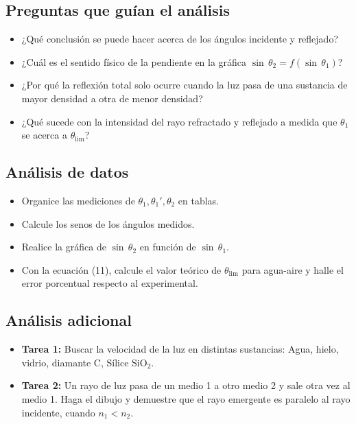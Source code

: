 \subsection{Preguntas que guían el análisis}

\begin{itemize}
    \item ¿Qué conclusión se puede hacer acerca de los ángulos incidente y reflejado?
    \item ¿Cuál es el sentido físico de la pendiente en la gráfica $\sin  \, \theta_2 = f(\sin  \, \theta_1)$?
    \item ¿Por qué la reflexión total solo ocurre cuando la luz pasa de una sustancia de mayor densidad a otra de menor densidad?
    \item ¿Qué sucede con la intensidad del rayo refractado y reflejado a medida que $\theta_1$ se acerca a $\theta_{\text{lim}}$?
\end{itemize}

\subsection{Análisis de datos}

\begin{itemize}
    \item Organice las mediciones de $\theta_1, \theta_1', \theta_2$ en tablas.
    \item Calcule los senos de los ángulos medidos.
    \item Realice la gráfica de $\sin  \, \theta_2$ en función de $\sin  \, \theta_1$.
    \item Con la ecuación (11), calcule el valor teórico de $\theta_{\text{lim}}$ para agua-aire y halle el error porcentual respecto al experimental.
\end{itemize}

\subsection{Análisis adicional}

\begin{itemize}
    \item \textbf{Tarea 1:} Buscar la velocidad de la luz en distintas sustancias: Agua, hielo, vidrio, diamante C, Sílice $\text{SiO}_2$.
    \item \textbf{Tarea 2:} Un rayo de luz pasa de un medio 1 a otro medio 2 y sale otra vez al medio 1. Haga el dibujo y demuestre que el rayo emergente es paralelo al rayo incidente, cuando $n_1 < n_2$.
\end{itemize}

